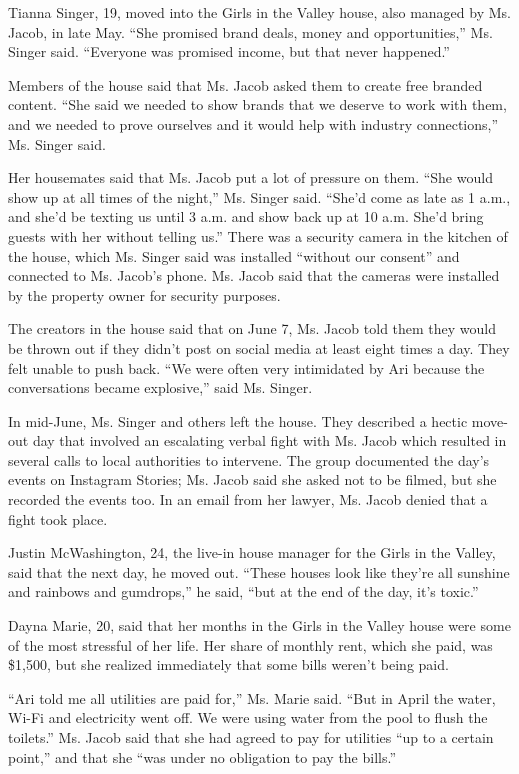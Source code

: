 Tianna Singer, 19, moved into the Girls in the Valley house, also
managed by Ms. Jacob, in late May. ``She promised brand deals, money and
opportunities,'' Ms. Singer said. ``Everyone was promised income, but
that never happened.''

Members of the house said that Ms. Jacob asked them to create free
branded content. ``She said we needed to show brands that we deserve to
work with them, and we needed to prove ourselves and it would help with
industry connections,'' Ms. Singer said.

Her housemates said that Ms. Jacob put a lot of pressure on them. ``She
would show up at all times of the night,'' Ms. Singer said. ``She'd come
as late as 1 a.m., and she'd be texting us until 3 a.m. and show back up
at 10 a.m. She'd bring guests with her without telling us.'' There was a
security camera in the kitchen of the house, which Ms. Singer said was
installed ``without our consent'' and connected to Ms. Jacob's phone.
Ms. Jacob said that the cameras were installed by the property owner for
security purposes.

The creators in the house said that on June 7, Ms. Jacob told them they
would be thrown out if they didn't post on social media at least eight
times a day. They felt unable to push back. ``We were often very
intimidated by Ari because the conversations became explosive,'' said
Ms. Singer.

In mid-June, Ms. Singer and others left the house. They described a
hectic move-out day that involved an escalating verbal fight with Ms.
Jacob which resulted in several calls to local authorities to intervene.
The group documented the day's events on Instagram Stories; Ms. Jacob
said she asked not to be filmed, but she recorded the events too. In an
email from her lawyer, Ms. Jacob denied that a fight took place.

Justin McWashington, 24, the live-in house manager for the Girls in the
Valley, said that the next day, he moved out. ``These houses look like
they're all sunshine and rainbows and gumdrops,'' he said, ``but at the
end of the day, it's toxic.''

Dayna Marie, 20, said that her months in the Girls in the Valley house
were some of the most stressful of her life. Her share of monthly rent,
which she paid, was \$1,500, but she realized immediately that some
bills weren't being paid.

``Ari told me all utilities are paid for,'' Ms. Marie said. ``But in
April the water, Wi-Fi and electricity went off. We were using water
from the pool to flush the toilets.'' Ms. Jacob said that she had agreed
to pay for utilities ``up to a certain point,'' and that she ``was under
no obligation to pay the bills.''

